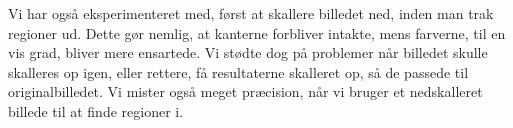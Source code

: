 {Vi har også eksperimenteret med, først at skallere billedet ned, inden
man trak regioner ud. Dette gør nemlig, at kanterne forbliver intakte,
mens farverne, til en vis grad, bliver mere ensartede. Vi stødte dog på
problemer når billedet skulle skalleres op igen, eller rettere, få
resultaterne skalleret op, så de passede til originalbilledet. Vi mister
også meget præcision, når vi bruger et nedskalleret billede til at finde
regioner i.

}

%
%
%
%
%
%

